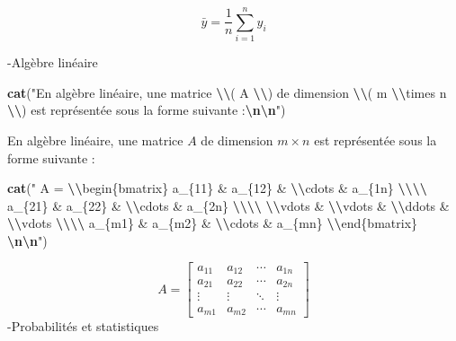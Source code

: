 \documentclass[
]{article}
\newenvironment{Shaded}{\begin{snugshade}}{\end{snugshade}}
\newcommand{\FunctionTok}[1]{\textcolor[rgb]{0.13,0.29,0.53}{\textbf{#1}}}
\newcommand{\NormalTok}[1]{#1}
\newcommand{\SpecialCharTok}[1]{\textcolor[rgb]{0.81,0.36,0.00}{\textbf{#1}}}
\newcommand{\StringTok}[1]{\textcolor[rgb]{0.31,0.60,0.02}{#1}}
\begin{document}
\[ \bar{y} = \frac{1}{n} \sum_{i=1}^{n} y_i \]

-Algèbre linéaire

\begin{Shaded}
\begin{Highlighting}[]
\FunctionTok{cat}\NormalTok{(}\StringTok{"En algèbre linéaire, une matrice }\SpecialCharTok{\textbackslash{}\textbackslash{}}\StringTok{( A }\SpecialCharTok{\textbackslash{}\textbackslash{}}\StringTok{) de dimension }\SpecialCharTok{\textbackslash{}\textbackslash{}}\StringTok{( m }\SpecialCharTok{\textbackslash{}\textbackslash{}}\StringTok{times n }\SpecialCharTok{\textbackslash{}\textbackslash{}}\StringTok{) est représentée sous la forme suivante :}\SpecialCharTok{\textbackslash{}n\textbackslash{}n}\StringTok{"}\NormalTok{)}
\end{Highlighting}
\end{Shaded}

En algèbre linéaire, une matrice \(A\) de dimension \(m \times n\) est
représentée sous la forme suivante :

\begin{Shaded}
\begin{Highlighting}[]
\FunctionTok{cat}\NormalTok{(}\StringTok{"$$ A = }\SpecialCharTok{\textbackslash{}\textbackslash{}}\StringTok{begin\{bmatrix\} }
\StringTok{a\_\{11\} \& a\_\{12\} \& }\SpecialCharTok{\textbackslash{}\textbackslash{}}\StringTok{cdots \& a\_\{1n\} }\SpecialCharTok{\textbackslash{}\textbackslash{}\textbackslash{}\textbackslash{}}\StringTok{ }
\StringTok{a\_\{21\} \& a\_\{22\} \& }\SpecialCharTok{\textbackslash{}\textbackslash{}}\StringTok{cdots \& a\_\{2n\} }\SpecialCharTok{\textbackslash{}\textbackslash{}\textbackslash{}\textbackslash{}}\StringTok{ }
\SpecialCharTok{\textbackslash{}\textbackslash{}}\StringTok{vdots \& }\SpecialCharTok{\textbackslash{}\textbackslash{}}\StringTok{vdots \& }\SpecialCharTok{\textbackslash{}\textbackslash{}}\StringTok{ddots \& }\SpecialCharTok{\textbackslash{}\textbackslash{}}\StringTok{vdots }\SpecialCharTok{\textbackslash{}\textbackslash{}\textbackslash{}\textbackslash{}}\StringTok{ }
\StringTok{a\_\{m1\} \& a\_\{m2\} \& }\SpecialCharTok{\textbackslash{}\textbackslash{}}\StringTok{cdots \& a\_\{mn\} }
\SpecialCharTok{\textbackslash{}\textbackslash{}}\StringTok{end\{bmatrix\} $$}\SpecialCharTok{\textbackslash{}n\textbackslash{}n}\StringTok{"}\NormalTok{)}
\end{Highlighting}
\end{Shaded}

\[ A = \begin{bmatrix} 
a_{11} & a_{12} & \cdots & a_{1n} \\ 
a_{21} & a_{22} & \cdots & a_{2n} \\ 
\vdots & \vdots & \ddots & \vdots \\ 
a_{m1} & a_{m2} & \cdots & a_{mn} 
\end{bmatrix} \] -Probabilités et statistiques
\end{document}
